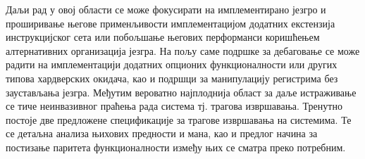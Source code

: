 Даљи рад у овој области се може фокусирати на имплементирано језгро и проширивање његове применљивости имплементацијом додатних екстензија инструкцијског сета или побољшање његових перформанси коришћењем алтернативних организација језгра.
На пољу саме подршке за дебаговање се може радити на имплементацији додатних опционих функционалности или других типова хардверских окидача, као и подршци за манипулацију регистрима без заустављања језгра.
Међутим вероватно најплоднија област за даље истраживање се тиче неинвазивног праћења рада система тј. трагова извршавања. Тренутно постоје две предложене спецификације за трагове извршавања на  системима. Те се детаљна анализа њихових предности и мана, као и предлог начина за постизање паритета функционалности између њих се сматра преко потребним.
